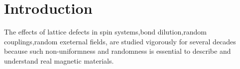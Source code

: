 \chapter{Introduction}\label{chap:introduction}
The effects of lattice defects in spin systems,bond dilution\cite{harris},random couplings\cite{edwards},random exeternal fields\cite{random-field},
are studied vigorously for several decades because such non-uniformness and randomness is essential to
describe and understand real magnetic materials.
